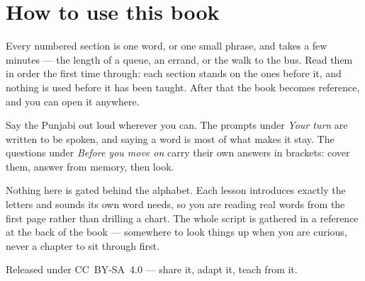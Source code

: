 \documentclass[11pt,twoside]{book}
\begin{document}
\section*{How to use this book}

Every numbered section is one word, or one small phrase, and takes a few
minutes --- the length of a queue, an errand, or the walk to the bus. Read them
in order the first time through: each section stands on the ones before it, and
nothing is used before it has been taught. After that the book becomes
reference, and you can open it anywhere.

Say the Punjabi out loud wherever you can. The prompts under \emph{Your turn}
are written to be spoken, and saying a word is most of what makes it stay. The
questions under \emph{Before you move on} carry their own answers in brackets:
cover them, answer from memory, then look.

Nothing here is gated behind the alphabet. Each lesson introduces exactly the
letters and sounds its own word needs, so you are reading real words from the
first page rather than drilling a chart. The whole script is gathered in a
reference at the back of the book --- somewhere to look things up when you are
curious, never a chapter to sit through first.

Released under CC~BY-SA~4.0 --- share it, adapt it, teach from it.

\tableofcontents

\mainmatter





















\backmatter






\end{document}
